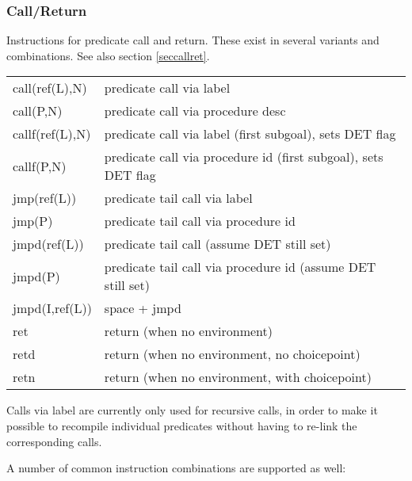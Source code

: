 \subsubsection{Call/Return}
Instructions for predicate call and return. These exist in several
variants and combinations. See also section \ref{seccallret}.

\begin{tabular}{|p{}|p{}|}
\hline
call(ref(L),N)          & predicate call via label \\
call(P,N)               & predicate call via procedure desc \\
callf(ref(L),N)         & predicate call via label (first subgoal), sets DET flag \\
callf(P,N)              & predicate call via procedure id (first subgoal), sets DET flag \\
jmp(ref(L))             & predicate tail call via label \\
jmp(P)                  & predicate tail call via procedure id \\
jmpd(ref(L))            & predicate tail call (assume DET still set) \\
jmpd(P)                 & predicate tail call via procedure id (assume DET still set) \\
jmpd(I,ref(L))          & space + jmpd \\
ret                     & return (when no environment) \\
retd                    & return (when no environment, no choicepoint) \\
retn                    & return (when no environment, with choicepoint) \\
\hline
\end{tabular}

Calls via label are currently only used for recursive calls, in order to
make it possible to recompile individual predicates without having to
re-link the corresponding calls.

A number of common instruction combinations are supported as well:

